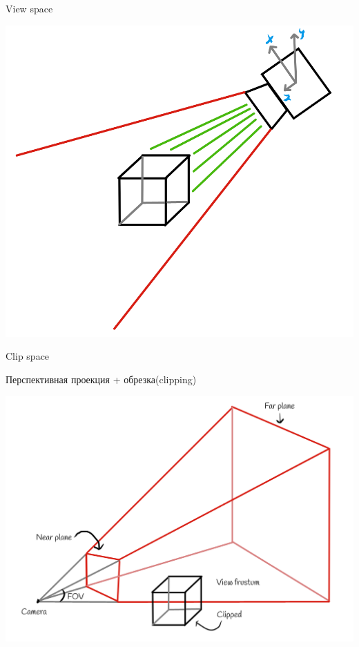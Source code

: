\documentclass{beamer}
\begin{document}
\begin{frame}{View space}
\begin{center}
\includegraphics[width=0.7 \linewidth]{view.png}
\end{center}
\end{frame}

\begin{frame}{Clip space}

Перспективная проекция + обрезка(clipping)
\begin{center}
\includegraphics[width=0.8 \linewidth]{my_frustum.png}
\end{center}

\end{frame}
\end{document}
